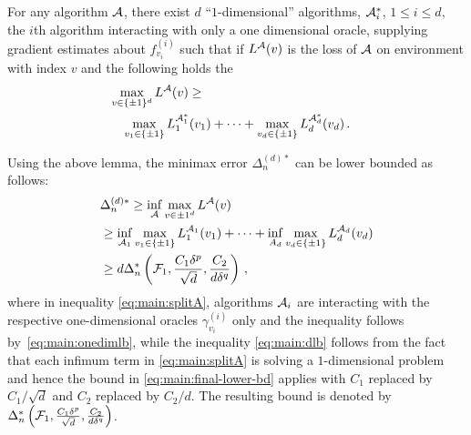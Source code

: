 \begin{lemma}
For any algorithm $\mathcal{A}$, there exist  $d$ ``$1$-dimensional'' algorithms, $\mathcal{A}_i^*$, $1\le i \le d$,
the $i$th algorithm interacting with only a one dimensional oracle, supplying gradient estimates about $f_{v_i}^{(i)}$ 
such that if $L^{\mathcal{A}}(v)$ is the loss of $\mathcal{A}$ on environment with index $v$ and the following holds
the 
\begin{align}
\label{eq:main:onedimlb}
&\hspace{-1em}\max_{v\in \{\pm 1\}^d} L^{\mathcal{A}}(v) 
\ge \nonumber\\
&  \max_{v_1\in \{\pm 1\}} L_1^{\mathcal{A}_1^*}(v_1) + \dots + \max_{v_d\in \{\pm 1 \}} L_d^{\mathcal{A}^*_d}(v_d)\,.
\end{align}
\end{lemma}
Using the above lemma, the minimax error $\Delta_n^{(d)*}$ can be lower bounded as follows:
\begin{align}
&
\Delta_n^{(d)*}  \ge  \inf_{\mathcal{A}} \max_{v\in {\pm 1}^d} L^{\mathcal{A}}(v) \nonumber\\
 & \ge \inf_{\mathcal{A}_1} \max_{v_1\in \{\pm 1\}} L_1^{\mathcal{A}_1}(v_1) + \dots + 
 			\inf_{A_d} \max_{v_d\in \{\pm 1 \}} L_d^{\mathcal{A}_d}(v_d) \label{eq:main:splitA}\\
               & \ge d \Delta_n^{*}\left(\mathcal{F}_1,\frac{C_1\delta^p}{\sqrt d}, \frac{C_2}{d\delta^q}\right)\,, \label{eq:main:dlb}
\end{align}
where in inequality \eqref{eq:main:splitA}, algorithms $\mathcal{A}_i$ are interacting with the respective one-dimensional oracles $\gamma^{(i)}_{v_i}$ only 
and the inequality follows by~\eqref{eq:main:onedimlb},
while the inequality \eqref{eq:main:dlb} follows from the fact that each infimum term in \eqref{eq:main:splitA} is solving a $1$-dimensional problem and hence the bound in \eqref{eq:main:final-lower-bd} applies with $C_1$ replaced by $C_1/\sqrt{d}$ and $C_2$ replaced by $C_2/d$. The resulting bound is denoted by $\Delta_n^{*}\left(\mathcal{F}_1,\frac{C_1\delta^p}{\sqrt d}, \frac{C_2}{d\delta^q}\right)$. 

